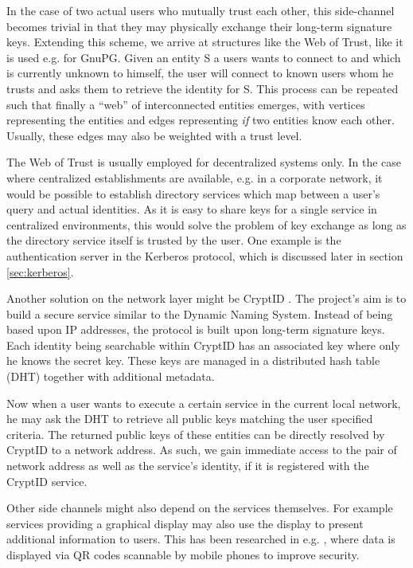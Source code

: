 In the case of two actual users who mutually trust each other, this side-channel becomes trivial in that they may physically exchange their long-term signature keys.
Extending this scheme, we arrive at structures like the Web of Trust, like it is used e.g. for GnuPG.
Given an entity S a users wants to connect to and which is currently unknown to himself, the user will connect to known users whom he trusts and asks them to retrieve the identity for S.
This process can be repeated such that finally a ``web'' of interconnected entities emerges, with vertices representing the entities and edges representing \emph{if} two entities know each other.
Usually, these edges may also be weighted with a trust level.

The Web of Trust is usually employed for decentralized systems only.
In the case where centralized establishments are available, e.g. in a corporate network, it would be possible to establish directory services which map between a user's query and actual identities.
As it is easy to share keys for a single service in centralized environments, this would solve the problem of key exchange as long as the directory service itself is trusted by the user.
One example is the authentication server in the Kerberos protocol, which is discussed later in section \ref{sec:kerberos}.

Another solution on the network layer might be CryptID \cite{malchow2015cryptid}.
The project's aim is to build a secure service similar to the Dynamic Naming System.
Instead of being based upon IP addresses, the protocol is built upon long-term signature keys.
Each identity being searchable within CryptID has an associated key where only he knows the secret key.
These keys are managed in a distributed hash table (DHT) together with additional metadata.

Now when a user wants to execute a certain service in the current local network, he may ask the DHT to retrieve all public keys matching the user specified criteria.
The returned public keys of these entities can be directly resolved by CryptID to a network address.
As such, we gain immediate access to the pair of network address as well as the service's identity, if it is registered with the CryptID service.

Other side channels might also depend on the services themselves.
For example services providing a graphical display may also use the display to present additional information to users.
This has been researched in e.g. \cite{mccune2005seeing,saxena2006secure}, where data is displayed via QR codes scannable by mobile phones to improve security.

